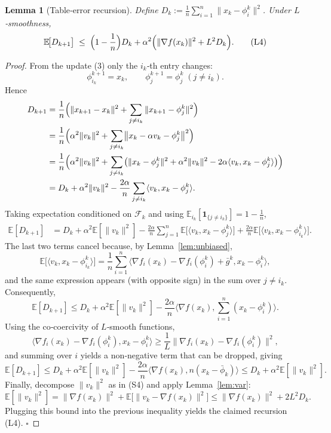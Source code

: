 \documentclass{article}
\newtheorem{lemma}{Lemma}
\newcommand{\E}{\mathbb{E}}
\begin{document}
\begin{lemma}[Table‑error recursion]\label{lem:table}
Define $D_k:=\frac1n\sum_{i=1}^{n}\|x_k-\phi_i^{k}\|^{2}$.  
Under $L$‑smoothness,
\[
\E\!\bigl[D_{k+1}\bigr]\;\le\;
\Bigl(1-\frac{1}{n}\Bigr)D_k
   +\alpha^{2}\Bigl(\|\nabla f(x_k)\|^{2}+L^{2}D_k\Bigr).
\tag{L4}
\]
\end{lemma}
\begin{proof}
From the update (3) only the $i_k$‑th entry changes:
\[
\phi_{i_k}^{k+1}=x_k,\qquad \phi_{j}^{k+1}=\phi_{j}^{k}\;(j\neq i_k).
\]
Hence
\[
\begin{aligned}
D_{k+1}
&=\frac1n\Bigl(\|x_{k+1}-x_k\|^{2}
   +\sum_{j\neq i_k}\|x_{k+1}-\phi_j^{k}\|^{2}\Bigr)\\
&=\frac1n\Bigl(\alpha^{2}\|v_k\|^{2}
   +\sum_{j\neq i_k}\bigl\|x_k-\alpha v_k-\phi_j^{k}\bigr\|^{2}\Bigr)\\
&=\frac1n\Bigl(\alpha^{2}\|v_k\|^{2}
   +\sum_{j\neq i_k}\bigl(\|x_k-\phi_j^{k}\|^{2}
        +\alpha^{2}\|v_k\|^{2}
        -2\alpha\langle v_k,x_k-\phi_j^{k}\rangle\bigr)\Bigr)\\
&=D_k+\alpha^{2}\|v_k\|^{2}
   -\frac{2\alpha}{n}\sum_{j\neq i_k}\langle v_k,x_k-\phi_j^{k}\rangle .
\end{aligned}
\]
Taking expectation conditioned on $\mathcal F_k$ and using
$\E_{i_k}[\mathbf 1_{\{j\neq i_k\}}]=1-\frac1n$,
\[
\begin{aligned}
\E[D_{k+1}]
&=D_k+\alpha^{2}\E[\|v_k\|^{2}]
   -\frac{2\alpha}{n}\sum_{j=1}^{n}\E\!\bigl[\langle v_k,x_k-\phi_j^{k}\rangle\bigr]
   +\frac{2\alpha}{n}\E\!\bigl[\langle v_k,x_k-\phi_{i_k}^{k}\rangle\bigr].
\end{aligned}
\]
The last two terms cancel because, by Lemma~\ref{lem:unbiased},
\[
\E\!\bigl[\langle v_k,x_k-\phi_{i_k}^{k}\rangle\bigr]
   =\frac1n\sum_{i=1}^{n}\langle\nabla f_i(x_k)-\nabla f_i(\phi_i^{k})+\bar g^k,
                     x_k-\phi_i^{k}\rangle,
\]
and the same expression appears (with opposite sign) in the sum over $j\neq i_k$.
Consequently,
\[
\E[D_{k+1}]
\le D_k+\alpha^{2}\E[\|v_k\|^{2}]
   -\frac{2\alpha}{n}\langle\nabla f(x_k),\sum_{i=1}^{n}(x_k-\phi_i^{k})\rangle .
\]
Using the co‑coercivity of $L$‑smooth functions,
\[
\langle\nabla f_i(x_k)-\nabla f_i(\phi_i^{k}),x_k-\phi_i^{k}\rangle
   \ge\frac{1}{L}\|\nabla f_i(x_k)-\nabla f_i(\phi_i^{k})\|^{2},
\]
and summing over $i$ yields a non‑negative term that can be dropped, giving
\[
\E[D_{k+1}]
\le D_k+\alpha^{2}\E[\|v_k\|^{2}]
   -\frac{2\alpha}{n}\langle\nabla f(x_k),n(x_k-\bar\phi_k)\rangle
\le D_k+\alpha^{2}\E[\|v_k\|^{2}].
\]
Finally, decompose $\|v_k\|^{2}$ as in (S4) and apply Lemma~\ref{lem:var}:
\[
\E[\|v_k\|^{2}]
= \|\nabla f(x_k)\|^{2}
  +\E\!\bigl[\|v_k-\nabla f(x_k)\|^{2}\bigr]
\le \|\nabla f(x_k)\|^{2}+2L^{2}D_k .
\]
Plugging this bound into the previous inequality yields the claimed recursion (L4). $\square$
\end{proof}
\end{document}
